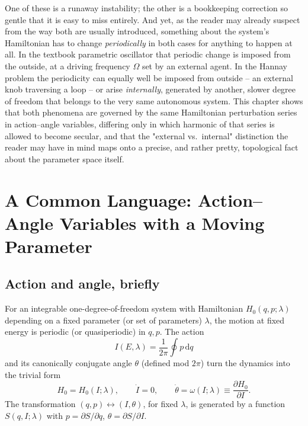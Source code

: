 \documentclass[11pt]{book}
\newcommand{\dd}{\mathrm{d}}
\begin{document}
One of these is a runaway instability; the other is a bookkeeping correction so gentle that it is
easy to miss entirely. And yet, as the reader may already suspect from the way both are usually
introduced, something about the system's Hamiltonian has to change \emph{periodically} in both
cases for anything to happen at all. In the textbook parametric oscillator that periodic change is
imposed from the outside, at a driving frequency $\Omega$ set by an external agent. In the Hannay
problem the periodicity can equally well be imposed from outside -- an external knob traversing a
loop -- or arise \emph{internally}, generated by another, slower degree of freedom that belongs to
the very same autonomous system. This chapter shows that both phenomena are governed by the same
Hamiltonian perturbation series in action--angle variables, differing only in which harmonic of
that series is allowed to become secular, and that the "external vs.\ internal" distinction the
reader may have in mind maps onto a precise, and rather pretty, topological fact about the
parameter space itself.

\section{A Common Language: Action--Angle Variables with a Moving Parameter}
\label{sec:common}

\subsection{Action and angle, briefly}

For an integrable one-degree-of-freedom system with Hamiltonian $H_0(q,p;\lambda)$ depending on a
fixed parameter (or set of parameters) $\lambda$, the motion at fixed energy is periodic (or
quasiperiodic) in $q,p$. The action
\begin{equation}
I(E,\lambda) = \frac{1}{2\pi}\oint p \,\dd q
\end{equation}
and its canonically conjugate angle $\theta$ (defined mod $2\pi$) turn the dynamics into the
trivial form
\begin{equation}
H_0 = H_0(I;\lambda), \qquad \dot I = 0, \qquad \dot\theta = \omega(I;\lambda) \equiv
\frac{\partial H_0}{\partial I}.
\end{equation}
The transformation $(q,p)\leftrightarrow(I,\theta)$, for fixed $\lambda$, is generated by a
function $S(q,I;\lambda)$ with $p = \partial S/\partial q$, $\theta = \partial S/\partial I$.
\end{document}
